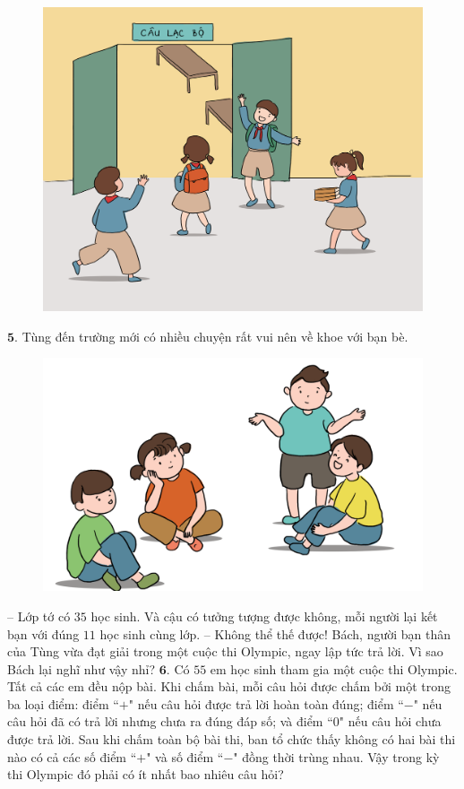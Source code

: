 \begin{multicols}{2}
\begin{figure}[H]
		\includegraphics[width=1\linewidth]{Pi10_ToanBi_Bai4}
		\vspace*{-15pt}
	\end{figure}
	$\pmb{5.}$ Tùng đến trường mới có nhiều chuyện rất vui nên về khoe với bạn bè.
	\begin{figure}[H]
		\centering
		\captionsetup{labelformat= empty, justification=centering}
		\includegraphics[width=1\linewidth]{Pi10_ToanBi_Bai5}
		\vspace*{-15pt}
	\end{figure}
	-- Lớp tớ có $35$ học sinh. Và cậu có tưởng tượng được không, mỗi người lại kết bạn với đúng $11$ học sinh cùng lớp.
	\vskip 0.1cm
	-- Không thể thế được! Bách, người bạn thân của Tùng vừa đạt giải trong một cuộc thi Olympic, ngay lập tức trả lời.
	\vskip 0.1cm
	Vì sao Bách lại nghĩ như vậy nhỉ?
	\vskip 0.1cm
	$\pmb{6.}$ Có $55$ em học sinh tham gia một cuộc thi Olympic. Tất cả các em đều nộp bài. Khi chấm bài, mỗi câu hỏi được chấm bởi một trong ba loại điểm: điểm ``$+$" nếu câu hỏi được trả lời hoàn toàn đúng; điểm ``$-$" nếu câu hỏi đã có trả lời nhưng chưa ra đúng đáp số; và điểm ``$0$" nếu câu hỏi chưa được trả lời. Sau khi chấm toàn bộ bài thi, ban tổ chức thấy không có hai bài thi nào có cả các số điểm ``$+$" và số điểm ``$-$" đồng thời trùng nhau. Vậy trong kỳ thi Olympic đó phải có ít nhất bao nhiêu câu hỏi?
\end{multicols}
